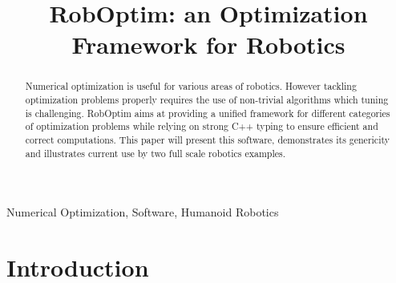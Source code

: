 \documentclass[conference,final,a4paper,twocolumn,9pt]{IEEEtran}
\begin{document}
\title{RobOptim: an Optimization Framework for Robotics}

\author{
\and
{}
\and
{}
\and
{}
}

\maketitle

\begin{abstract}
\boldmath Numerical optimization is useful for various areas of
robotics. However tackling optimization problems properly requires the
use of non-trivial algorithms which tuning is challenging. RobOptim
aims at providing a unified framework for different categories of
optimization problems while relying on strong C++ typing to ensure
efficient and correct computations. This paper will present this
software, demonstrates its genericity and illustrates current use by two
full scale robotics examples.
\end{abstract}

\begin{IEEEkeywords}
  Numerical Optimization, Software, Humanoid Robotics
\end{IEEEkeywords}

\IEEEpeerreviewmaketitle

\section{Introduction}\label{sec:introduction}
\end{document}

